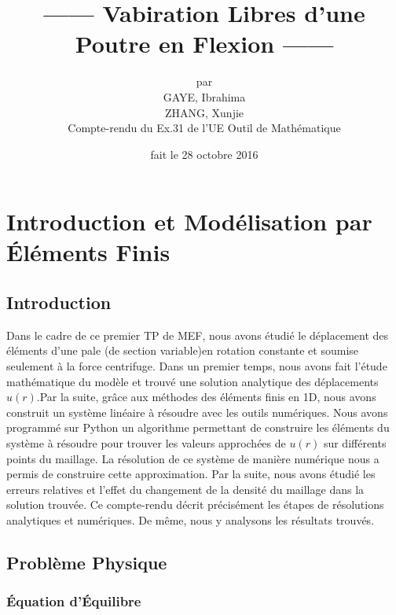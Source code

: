 \documentclass[a4paper,10pt]{report} %
\title{------ Vabiration Libres d'une Poutre en Flexion ------} %
\author{par\\GAYE, Ibrahima\\ ZHANG, Xunjie\\ Compte-rendu du Ex.31 de l'UE Outil de Mathématique } %
\date{fait le 28 octobre 2016} %
\begin{document}
\maketitle %
\tableofcontents %
\listoffigures %













\chapter{Introduction et Modélisation par Éléments Finis}

\section{Introduction}

Dans le cadre de ce premier TP de MEF, nous avons étudié le déplacement des éléments d'une pale (de section variable)en rotation constante et soumise seulement à la force centrifuge.
Dans un premier temps, nous avons fait l'étude mathématique du modèle et trouvé une solution analytique des déplacements $u(r)$.Par la suite, grâce aux méthodes des éléments finis en 1D, nous avons construit un système linéaire à résoudre avec les outils numériques.
Nous avons programmé sur Python un algorithme permettant de construire les éléments du système à résoudre pour trouver les valeurs approchées de $u(r)$ sur différents points du maillage. La résolution de ce système de manière numérique nous a permis de construire cette approximation.
Par la suite, nous avons étudié les erreurs relatives et l'effet du changement de la densité du maillage dans la solution trouvée.
Ce compte-rendu décrit précisément les étapes de résolutions analytiques et numériques. De même, nous y analysons les résultats trouvés.

\section{Problème Physique}

\subsection{Équation d'Équilibre}
\end{document}
